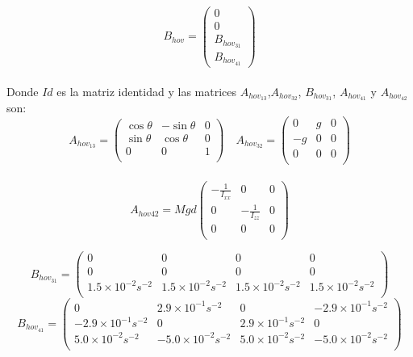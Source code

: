 \begin{equation}
\label{eq:Bhov}
B_{hov}=\left(\begin{array}{c}
0\\
0\\
B_{hov_{31}}\\
B_{hov_{41}} 
\end{array}\right)
\end{equation}\\

Donde $Id$ es la matriz identidad y las matrices $A_{hov_{13}}$,$A_{hov_{32}}$, $B_{hov_{31}}$, $A_{hov_{41}}$ y $A_{hov_{42}}$ son:
\begin{equation}
A_{hov_{13}}=\left(\begin{array}{ccc}
\cos\theta & -\sin\theta & 0 \\
\sin\theta & \cos\theta & 0\\
0 & 0 &1\\
\end{array}\right) \quad 
A_{hov_{32}}=\left(\begin{array}{ccc}
0 & g & 0 \\
-g & 0 & 0\\
0 & 0 &0\\
\end{array}\right)
\end{equation}\\
\begin{equation}
A_{hov{42}} =Mgd\left(\begin{array}{ccc}
-\frac{1}{I_{xx}} & 0 & 0 \\
0 & -\frac{1}{I_{zz}} & 0\\
0 & 0 &0\\
\end{array}\right)
\end{equation}

\begin{equation}
B_{hov_{31}}=\left(\begin{array}{cccc}
0&0&0&0\\
0&0&0&0\\
1.5\times10^{-2}s^{-2} &1.5\times10^{-2}s^{-2} & 1.5\times10^{-2}s^{-2}& 1.5\times10^{-2}s^{-2} \\
\end{array}\right) 
\end{equation}
\begin{equation}
B_{hov_{41}}=\left(\begin{array}{cccc}
0 & 2.9\times10^{-1}s^{-2} & 0 &-2.9\times10^{-1}s^{-2} \\
-2.9\times10^{-1}s^{-2} &0& 2.9\times10^{-1}s^{-2} &0\\
5.0\times10^{-2}s^{-2} & -5.0\times10^{-2}s^{-2} &5.0\times10^{-2}s^{-2} &-5.0\times10^{-2}s^{-2}\\
\end{array}\right)
\end{equation}

